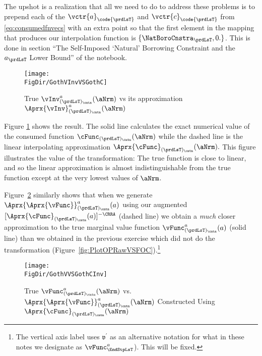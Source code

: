 \documentclass[\econtexRoot/SolvingMicroDSOPs]{subfiles}
\begin{document}
The upshot is a realization that all we need to do to address these problems is to prepend each of the $\vctr{a}_{\code{\prdLsT}}$ and $\vctr{c}_{\code{\prdLsT}}$ from \eqref{eq:consumedfnvecs} with an extra point so that the first element in the mapping that produces our interpolation function is $\{\NatBoroCnstra_{\prdLsT},0.\}$. This is done in section ``The Self-Imposed `Natural' Borrowing Constraint and the $a_{\prdLsT}$ Lower Bound'' of the notebook.%


\hypertarget{GothVInvVSGothC}{}
\begin{figure}
  \centerline{\texttt{[image: \\FigDir/GothVInvVSGothC]}}
  \caption{True $\vInv^{{a}}_{({\prdLsT})_\cntn}(\aNrm)$ vs its approximation $\Aprx{\vInv}^{{a}}_{({\prdLsT})_\cntn}(\aNrm)$}
  \label{fig:GothVInvVSGothC}
\end{figure}

Figure \ref{fig:GothVInvVSGothC} shows the result. The solid line calculates the exact numerical value of the consumed function $\cFunc_{({\prdLsT})_\cntn}(\aNrm)$ while the dashed line is the linear interpolating approximation $\Aprx{\cFunc}_{({\prdLsT})_\cntn}(\aNrm).$ This figure illustrates the value of the transformation: The true function is close to linear, and so the linear approximation is almost indistinguishable from the true function except at the very lowest values of $\aNrm$.

Figure~\ref{fig:GothVVSGothCInv} similarly shows that when we generate $\Aprx{\Aprx{\vFunc}}_{({\prdLsT})_\cntn}^{{a}}({a})$ using our augmented $[\Aprx{\cFunc}_{({\prdLsT})_\cntn}({a})]^{-\CRRA}$ (dashed line) we obtain a \textit{much} closer approximation to the true marginal value function $\vFunc^{{a}}_{({\prdLsT})_\cntn}({a})$ (solid line) than we obtained in the previous exercise which did not do the transformation (Figure~\ref{fig:PlotOPRawVSFOC}).\footnote{The vertical axis label uses $\mathfrak{v}^{\prime}$ as an alternative notation for what in these notes we designate as $\vFunc^{a}_{\EndStpLsT}$).  This will be fixed.}

\hypertarget{GothVVSGothCInv}{}
\begin{figure}
  \centerline{\texttt{[image: \\FigDir/GothVVSGothCInv]}}
  \caption{True $\vFunc^{{a}}_{({\prdLsT})_\cntn}(\aNrm)$ vs. $\Aprx{\Aprx{\vFunc}}_{({\prdLsT})_\cntn}^{{a}}(\aNrm)$ Constructed Using $\Aprx{\cFunc}_{({\prdLsT})_\cntn}(\aNrm)$}
  \label{fig:GothVVSGothCInv}
\end{figure}
\end{document}

